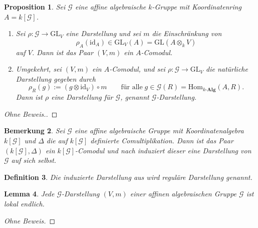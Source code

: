 \documentclass[a4paper, 11pt]{scrartcl}
\newcommand{\Hom}{\text{Hom}}
\newcommand{\id}{\text{id}}
\theoremstyle{basicstyle}
\newtheorem{definition}{Definition}[section]
\newtheorem{bemerkung}[definition]{Bemerkung}
\newtheorem{lemma}[definition]{Lemma}
\newtheorem{proposition}[definition]{Proposition}
\begin{document}
    \begin{proposition}\label{prop:2}
        Sei \(\mathcal{G}\) eine affine algebraische \(k\)-Gruppe mit Koordinatenring \(A = k[\mathcal{G}]\).
        \begin{enumerate}
            \item Sei \(\rho : \mathcal{G} \to \text{GL}_V\) eine Darstellung und sei \(m\) die Einschränkung von
                \[\rho_A(\id_A) \in \text{GL}_V(A) = \text{GL}(A \otimes_k V)\]
                auf \(V\).
                Dann ist das Paar \((V, m)\) ein \(A\)-Comodul.

            \item Umgekehrt, sei \((V, m)\) ein \(A\)-Comodul, und sei \(\rho: \mathcal{G} \to \text{GL}_V\) die \emph{natürliche Darstellung} gegeben durch
                \[\rho_R(g) := (g \otimes \id_V) \circ m \qquad \text{für alle}\; g \in \mathcal{G}(R) = \Hom_{k\textbf{-Alg}}(A, R).\]
                Dann ist \(\rho\) eine Darstellung für \(\mathcal{G}\), genannt \(\mathcal{G}\)-Darstellung.
        \end{enumerate}
    \end{proposition}
    \begin{proof}[Ohne Beweis.]
    \end{proof}
    
    \begin{bemerkung}\label{bem:3}
        Sei \(\mathcal{G}\) eine affine algebraische Gruppe mit Koordinatenalgebra \(k[\mathcal{G}]\) und \(\Delta\) die auf \(k[\mathcal{G}]\) definierte Comultiplikation.
        Dann ist das Paar \((k[\mathcal{G}], \Delta)\) ein \(k[\mathcal{G}]\)-Comodul und nach  induziert dieser eine Darstellung von \(\mathcal{G}\) auf sich selbst.
    \end{bemerkung}

    \begin{definition}
        Die induzierte Darstellung aus  wird \emph{reguläre Darstellung} genannt.
    \end{definition}

    \begin{lemma}\label{lem:2}
        Jede \(\mathcal{G}\)-Darstellung \((V, m)\) einer affinen algebraischen Gruppe \(\mathcal{G}\) ist lokal endlich.
    \end{lemma}
    \begin{proof}[Ohne Beweis]
    \end{proof}
\end{document}
